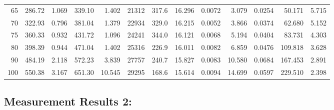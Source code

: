 \documentclass[10pt]{article}
\begin{document}
{\begin{tabular}{|r|rr|rr|rr|rr|rr|r|r|}
       65 &       286.72 &        1.069 &       339.10 &        1.402 &        21312 &        317.6 &       16.296 &       0.0072 &        3.079 &       0.0254 &       50.171 &        5.715 \\
       70 &       322.93 &        0.796 &       381.04 &        1.379 &        22934 &        329.0 &       16.215 &       0.0052 &        3.866 &       0.0374 &       62.680 &        5.152 \\
       75 &       360.33 &        0.932 &       431.72 &        1.096 &        24241 &        344.0 &       16.121 &       0.0068 &        5.194 &       0.0404 &       83.731 &        4.303 \\
       80 &       398.39 &        0.944 &       471.04 &        1.402 &        25316 &        226.9 &       16.011 &       0.0082 &        6.859 &       0.0476 &      109.818 &        3.628 \\
       90 &       484.19 &        2.118 &       572.23 &        3.839 &        27757 &        240.7 &       15.827 &       0.0083 &       10.580 &       0.0684 &      167.453 &        2.891 \\
      100 &       550.38 &        3.167 &       651.30 &       10.545 &        29295 &        168.6 &       15.614 &       0.0094 &       14.699 &       0.0597 &      229.510 &        2.398 \\
\hline
\end{tabular}
}



\subsection*{\large \bf Measurement Results 2:}
\end{document}
